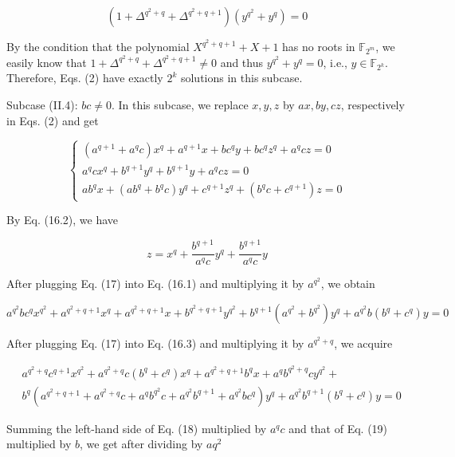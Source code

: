 \documentclass[10pt]{article}
\begin{document}
$$
\left(1+\Delta^{q^{2}+q}+\Delta^{q^{2}+q+1}\right)\left(y^{q^{2}}+y^{q}\right)=0
$$

By the condition that the polynomial $X^{q^{2}+q+1}+X+1$ has no roots in $\mathbb{F}_{2^{m}}$, we easily know that $1+ \Delta^{q^{2}+q}+\Delta^{q^{2}+q+1} \neq 0$ and thus $y^{q^{2}}+y^{q}=0$, i.e., $y \in \mathbb{F}_{2^{k}}$. Therefore, Eqs. (2) have exactly $2^{k}$ solutions in this subcase.

Subcase (II.4): $b c \neq 0$. In this subcase, we replace $x, y, z$ by $a x, b y, c z$, respectively in Eqs. (2) and get

\[
\left\{\begin{array}{l}
\left(a^{q+1}+a^{q} c\right) x^{q}+a^{q+1} x+b c^{q} y+b c^{q} z^{q}+a^{q} c z=0  \tag{16.1}\\
a^{q} c x^{q}+b^{q+1} y^{q}+b^{q+1} y+a^{q} c z=0 \\
a b^{q} x+\left(a b^{q}+b^{q} c\right) y^{q}+c^{q+1} z^{q}+\left(b^{q} c+c^{q+1}\right) z=0
\end{array}\right.
\]

By Eq. (16.2), we have


\begin{equation*}
z=x^{q}+\frac{b^{q+1}}{a^{q} c} y^{q}+\frac{b^{q+1}}{a^{q} c} y \tag{17}
\end{equation*}


After plugging Eq. (17) into Eq. (16.1) and multiplying it by $a^{q^{2}}$, we obtain


\begin{equation*}
a^{q^{2}} b c^{q} x^{q^{2}}+a^{q^{2}+q+1} x^{q}+a^{q^{2}+q+1} x+b^{q^{2}+q+1} y^{q^{2}}+b^{q+1}\left(a^{q^{2}}+b^{q^{2}}\right) y^{q}+a^{q^{2}} b\left(b^{q}+c^{q}\right) y=0 \tag{18}
\end{equation*}


After plugging Eq. (17) into Eq. (16.3) and multiplying it by $a^{q^{2}+q}$, we acquire


\begin{align*}
& a^{q^{2}+q} c^{q+1} x^{q^{2}}+a^{q^{2}+q} c\left(b^{q}+c^{q}\right) x^{q}+a^{q^{2}+q+1} b^{q} x+a^{q} b^{q^{2}+q} c y^{q^{2}}+ \\
& b^{q}\left(a^{q^{2}+q+1}+a^{q^{2}+q} c+a^{q} b^{q^{2}} c+a^{q^{2}} b^{q+1}+a^{q^{2}} b c^{q}\right) y^{q}+a^{q^{2}} b^{q+1}\left(b^{q}+c^{q}\right) y=0 \tag{19}
\end{align*}


Summing the left-hand side of Eq. (18) multiplied by $a^{q} c$ and that of Eq. (19) multiplied by $b$, we get after dividing by $a q^{2}$
\end{document}
